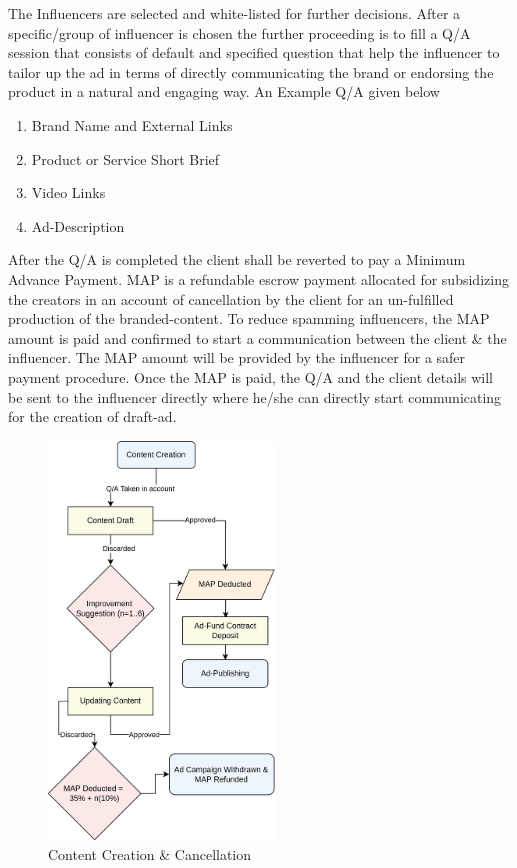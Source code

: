 \documentclass[conference]{IEEEtran}
\begin{document}
The Influencers are selected and white-listed for further decisions. After a specific/group of influencer is chosen the further proceeding is to fill a Q/A session that consists of default and specified question that help the influencer to tailor up the ad in terms of directly communicating the brand or endorsing the product in a natural and engaging way. An Example Q/A given below
\begin{enumerate}[wide, labelwidth=!, labelindent=0pt]
\item Brand Name and External Links
\item Product or Service Short Brief
\item Video Links
\item Ad-Description
\end{enumerate}
After the Q/A is completed the client shall be reverted to pay a Minimum Advance Payment. MAP is a refundable escrow payment allocated for subsidizing the creators in an account of cancellation by the client for an un-fulfilled production of the branded-content. To reduce spamming influencers, the MAP amount is paid and confirmed to start a communication between the client \& the influencer. The MAP amount will be provided by the influencer for a safer payment procedure. Once the MAP is paid, the Q/A and the client details will be sent to the influencer directly where he/she can directly start communicating for the creation of draft-ad.

\begin{figure}[H]
\begin{center}
\includegraphics[width=6cm]{ad-content}
\caption{Content Creation \& Cancellation}
\end{center}
\end{figure}
\end{document}
